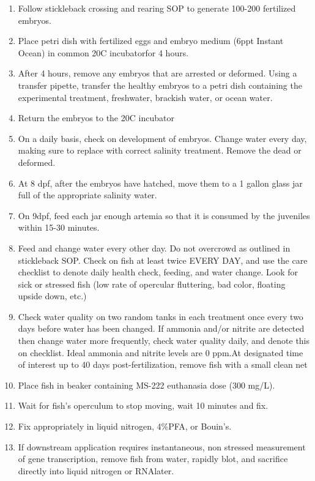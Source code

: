 \documentclass[
]{book}
\providecommand{\tightlist}{%
  \setlength{\itemsep}{0pt}\setlength{\parskip}{0pt}}
\begin{document}
\begin{enumerate}
\def\labelenumi{\arabic{enumi}.}
\tightlist
\item
  Follow stickleback crossing and rearing SOP to generate 100-200 fertilized embryos.
\item
  Place petri dish with fertilized eggs and embryo medium (6ppt Instant Ocean) in common 20C incubatorfor 4 hours.
\item
  After 4 hours, remove any embryos that are arrested or deformed. Using a transfer pipette, transfer the healthy embryos to a petri dish containing the experimental treatment, freshwater, brackish water, or ocean water.
\item
  Return the embryos to the 20C incubator
\item
  On a daily basis, check on development of embryos. Change water every day, making sure to replace with correct salinity treatment. Remove the dead or deformed.
\item
  At 8 dpf, after the embryos have hatched, move them to a 1 gallon glass jar full of the appropriate salinity water.
\item
  On 9dpf, feed each jar enough artemia so that it is consumed by the juveniles within 15-30 minutes.
\item
  Feed and change water every other day. Do not overcrowd as outlined in stickleback SOP. Check on fish at least twice EVERY DAY, and use the care checklist to denote daily health check, feeding, and water change. Look for sick or stressed fish (low rate of opercular fluttering, bad color, floating upside down, etc.)
\item
  Check water quality on two random tanks in each treatment once every two days before water has been changed. If ammonia and/or nitrite are detected then change water more frequently, check water quality daily, and denote this on checklist. Ideal ammonia and nitrite levels are 0 ppm.At designated time of interest up to 40 days post-fertilization, remove fish with a small clean net
\item
  Place fish in beaker containing MS-222 euthanasia dose (300 mg/L).
\item
  Wait for fish's operculum to stop moving, wait 10 minutes and fix.
\item
  Fix appropriately in liquid nitrogen, 4\%PFA, or Bouin's.
\item
  If downstream application requires instantaneous, non stressed measurement of gene transcription, remove fish from water, rapidly blot, and sacrifice directly into liquid nitrogen or RNAlater.
\end{enumerate}
\end{document}
